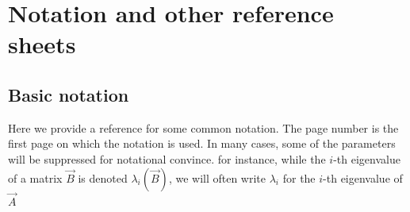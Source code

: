 \chapter{Notation and other reference sheets}
\label{chap:notation}

\section{Basic notation}

Here we provide a reference for some common notation.
The page number is the first page on which the notation is used.
In many cases, some of the parameters will be suppressed for notational convince.
for instance, while the \( i \)-th eigenvalue of a matrix \( \vec{B} \) is denoted \( \lambda_i(\vec{B}) \), we will often write \( \lambda_i \) for the \( i \)-th eigenvalue of \( \vec{A} \) 

